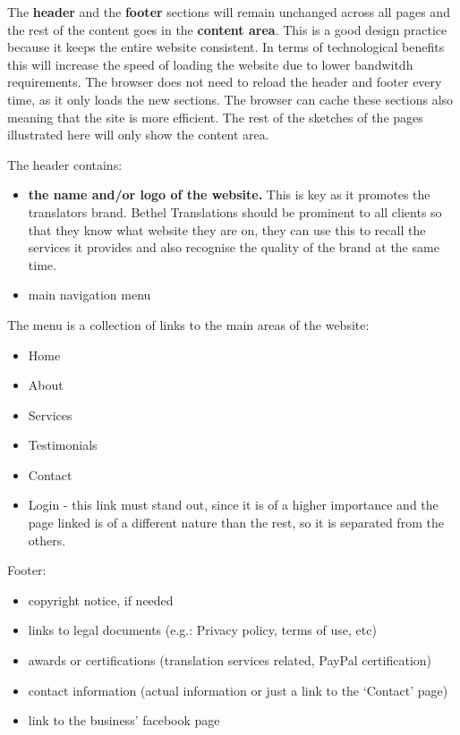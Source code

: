 \documentclass{l3proj}
\begin{document}
The \textbf{header} and the \textbf{footer} sections will remain unchanged
across all pages and the rest of the content goes in the \textbf{content area}.
This is a good design practice because it keeps the entire website consistent. In 
terms of technological benefits this will increase the speed of loading the website 
due to lower bandwitdh requirements. The browser does not need to reload the header 
and footer every time, as it only loads the new sections. The browser can cache
these sections also meaning that the site is more efficient.
The rest of the sketches of the pages illustrated here will only show the
content area.

The header contains:
\begin{itemize} \itemsep1pt \parskip0pt 
	\item \textbf{the name and/or logo of the website.} This is key as it promotes the translators brand. Bethel Translations should be prominent to all clients so that they know what website they are on, they can use this to recall the services it provides and also recognise the quality of the brand at the same time. 
	\item main navigation menu
\end{itemize}

The menu is a collection of links to the main areas of the website:
\begin{itemize} \itemsep1pt \parskip0pt 
	\item Home
	\item About
	\item Services
	\item Testimonials
	\item Contact
	\item Login - this link must stand out, since it is of a higher
	importance and the page linked is of a different nature than the rest,
	so it is separated from the others.
\end{itemize}


Footer:
\begin{itemize} \itemsep1pt \parskip0pt 
	\item copyright notice, if needed
	\item links to legal documents (e.g.: Privacy policy, terms of use, etc)
	\item awards or certifications (translation services related, 
	PayPal certification)
	\item contact information (actual information or just a link to the 
	`Contact’ page)
	\item link to the business’ facebook page
\end{itemize}
\end{document}
